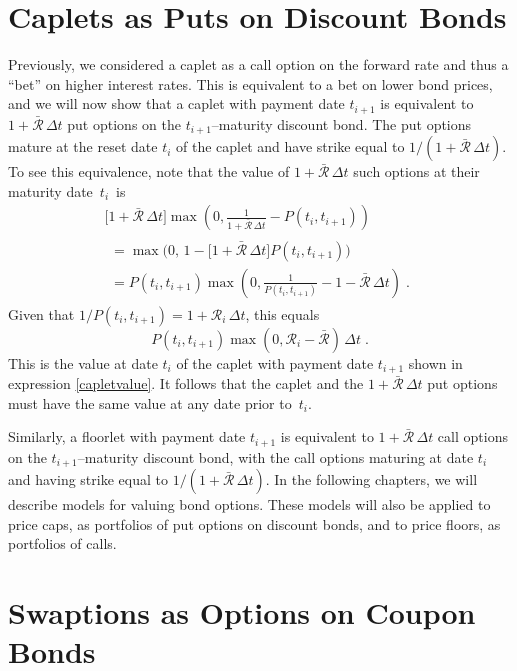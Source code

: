 \section{Caplets as Puts on Discount Bonds}\label{s_caps2}
Previously, we considered a caplet  as a call option on the forward rate and thus a ``bet'' on higher interest rates.  This is equivalent to a bet on lower bond prices, and we will now show that a caplet with payment date $t_{i+1}$ is equivalent to $1+\bar{\mathcal{R}}\,\varDelta t$ put options on the $t_{i+1}$--maturity discount bond.  The put options mature at the reset date $t_i$ of the caplet and have strike equal to $1/(1+ \bar{\mathcal{R}}\,\varDelta t)$.  To see this equivalence, note that the value of $1+\bar{\mathcal{R}}\,\varDelta t$ such options at their maturity date~$t_i$~is
\begin{multline*}
\big[1+\bar{\mathcal{R}}\,\varDelta t\big] \max\left(0,\frac{1}{1+ \bar{\mathcal{R}}\,\varDelta t}-P(t_i,t_{i+1})\right) \\ \begin{array}{l}
= \max\big(0,\,1-\big[1+\bar{\mathcal{R}}\,\varDelta t\big]P(t_i,t_{i+1})\big)\\
=P(t_i,t_{i+1})\max\left(0,\frac{1}{P(t_i,t_{i+1})}-1-\bar{\mathcal{R}}\,\varDelta t\right)\;. \end{array}
\end{multline*}
Given that $1/P(t_i,t_{i+1}) = 1+\mathcal{R}_i\,\varDelta t$, this equals
$$P(t_i,t_{i+1}) \max(0,\mathcal{R}_i-\bar{\mathcal{R}})\,\varDelta t\; .$$
This is the value  at date $t_i$ of the caplet with payment date $t_{i+1}$ shown in expression \eqref{capletvalue}.  It follows that the  caplet and the $1+\bar{\mathcal{R}}\,\varDelta t$ put options must have the same value at any date prior to~$t_i$.

Similarly, a floorlet  with payment date $t_{i+1}$ is equivalent to $1+\bar{\mathcal{R}}\,\varDelta t$ call options on the $t_{i+1}$--maturity discount bond, with the call options maturing at date $t_i$ and having strike equal to $1/(1+ \bar{\mathcal{R}}\,\varDelta t)$.  
In the following chapters, we will describe models for valuing bond options.  These models will also be applied to price caps, as portfolios of put options on discount bonds, and to price floors, as portfolios of calls.  

\section{Swaptions as Options on Coupon Bonds}\label{s_swaptionscouponbondoptions}


